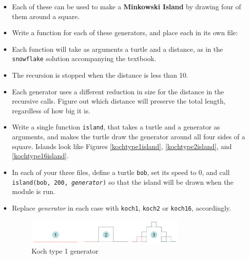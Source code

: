 \documentclass[12pt]{article}
\begin{document}
\begin{description}
\begin{itemize}
\item Each of these can be used to make a {\bf Minkowski Island}
by drawing four of them around a square.

\item Write a function for each of these generators, and 
place each in its own file: 

\item Each function will take as arguments a turtle and a distance,
as in the {\tt snowflake} solution accompanying the textbook.

\item The recursion is stopped when the distance is less than 10.

\item Each generator uses a different reduction in size
for the distance in the recursive calls.  Figure out which
distance will preserve the total length, regardless of how big
it is.

\item Write a single function {\tt island}, that takes a turtle
and a generator as arguments, and makes the turtle draw
the generator around all four sides of a square.
Islands look like Figures  \ref{kochtype1island},
\ref{kochtype2island}, and \ref{kochtype16island}.

\item In each of your three files, define a turtle {\tt bob},
set its speed to 0, and call {\tt island(bob, 200, {\sl generator})} so that
the island will be drawn when the module is run.

\item
Replace {\sl generator} in each case with {\tt koch1}, {\tt koch2}
or {\tt koch16}, accordingly.

\begin{figure}[!htbp]
\centerline{\includegraphics[width=0.75\textwidth]{kochtype1}}
\caption{Koch type 1 generator}
\label{kochtype1}
\end{figure}


\end{itemize}
\end{description}
\end{document}

